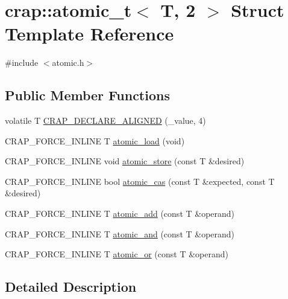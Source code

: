 \hypertarget{structcrap_1_1atomic__t_3_01_t_00_012_01_4}{\section{crap\+:\+:atomic\+\_\+t$<$ T, 2 $>$ Struct Template Reference}
\label{structcrap_1_1atomic__t_3_01_t_00_012_01_4}
}


{\ttfamily \#include $<$atomic.\+h$>$}

\subsection*{Public Member Functions}
\begin{DoxyCompactItemize}
\item 
volatile T \hyperlink{structcrap_1_1atomic__t_3_01_t_00_012_01_4_a86a2f87885243f7cc8b5ad809afb9b37}{C\+R\+A\+P\+\_\+\+D\+E\+C\+L\+A\+R\+E\+\_\+\+A\+L\+I\+G\+N\+E\+D} (\+\_\+value, 4)
\item 
C\+R\+A\+P\+\_\+\+F\+O\+R\+C\+E\+\_\+\+I\+N\+L\+I\+N\+E T \hyperlink{structcrap_1_1atomic__t_3_01_t_00_012_01_4_a920490fa2eec5f2691443abb71489284}{atomic\+\_\+load} (void)
\item 
C\+R\+A\+P\+\_\+\+F\+O\+R\+C\+E\+\_\+\+I\+N\+L\+I\+N\+E void \hyperlink{structcrap_1_1atomic__t_3_01_t_00_012_01_4_af68fc89fbc3561488fa6c54206e1a63a}{atomic\+\_\+store} (const T \&desired)
\item 
C\+R\+A\+P\+\_\+\+F\+O\+R\+C\+E\+\_\+\+I\+N\+L\+I\+N\+E bool \hyperlink{structcrap_1_1atomic__t_3_01_t_00_012_01_4_a571d6f5ff982691772eb4d83b101f85c}{atomic\+\_\+cas} (const T \&expected, const T \&desired)
\item 
C\+R\+A\+P\+\_\+\+F\+O\+R\+C\+E\+\_\+\+I\+N\+L\+I\+N\+E T \hyperlink{structcrap_1_1atomic__t_3_01_t_00_012_01_4_ac16a3fc634e7cfb5081cc8d15b48ec2b}{atomic\+\_\+add} (const T \&operand)
\item 
C\+R\+A\+P\+\_\+\+F\+O\+R\+C\+E\+\_\+\+I\+N\+L\+I\+N\+E T \hyperlink{structcrap_1_1atomic__t_3_01_t_00_012_01_4_ab4b3f9d7160a83ecfa0f4cd6130f00a1}{atomic\+\_\+and} (const T \&operand)
\item 
C\+R\+A\+P\+\_\+\+F\+O\+R\+C\+E\+\_\+\+I\+N\+L\+I\+N\+E T \hyperlink{structcrap_1_1atomic__t_3_01_t_00_012_01_4_a680056b92e2a977d2db0e5c6179fcd5f}{atomic\+\_\+or} (const T \&operand)
\end{DoxyCompactItemize}


\subsection{Detailed Description}
